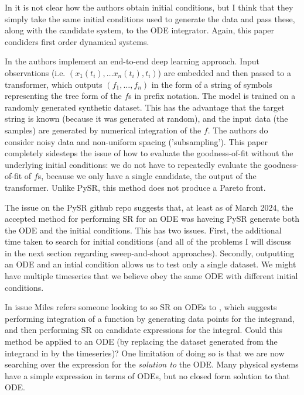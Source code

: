 \documentclass{article}
\begin{document}
In \cite{iba2008inference} it is not clear how the authors obtain initial conditions, but I think that they simply take the same initial conditions used to generate the data and pass these, along with the candidate system, to the ODE integrator. Again, this paper condiders first order dynamical systems.

In \cite{d2023odeformer} the authors implement an end-to-end deep learning approach.
Input observations (i.e. $(x_1(t_i), \dots x_n(t_i), t_i)$) are embedded and then passed to a transformer, which outputs $(f_1, \dots, f_n)$ in the form of a string of symbols representing the tree form of the $f$s in prefix notation.
The model is trained on a randomly generated synthetic dataset.
This has the advantage that the target string is known (because it was generated at random), and the input data (the samples) are generated by numerical integration of the $f$.
The authors do consider noisy data and non-uniform spacing ('subsampling').
This paper completely sidesteps the issue of how to evaluate the goodness-of-fit without the underlying initial conditions: we do not have to repeatedly evaluate the goodness-of-fit of $f$s, because we only have a single candidate, the output of the transformer.
Unlike PySR, this method does not produce a Pareto front.

The issue \cite{pysrissue568} on the PySR github repo suggests that, at least as of March 2024, the accepted method for performing SR for an ODE was haveing PySR generate both the ODE and the initial conditions.
This has two issues.
First, the additional time taken to search for initial conditions (and all of the problems I will discuss in the next section regarding sweep-and-shoot approaches).
Secondly, outputting an ODE and an intial condition allows us to test only a single dataset.
We might have multiple timeseries that we believe obey the same ODE with different initial conditions.

In issue \cite{pysrissue732} Miles refers someone looking to so SR on ODEs to \cite{pysrchangenotev1.3.0}, which suggests performing integration of a function by generating data points for the integrand, and then performing SR on candidate expressions for the integral.
Could this method be applied to an ODE (by replacing the dataset generated from the integrand in \cite{pysrchangenotev1.3.0} by the timeseries)?
One limitation of doing so is that we are now searching over the expression for the \emph{solution to} the ODE.
Many physical systems have a simple expression in terms of ODEs, but no closed form solution to that ODE.
\end{document}
